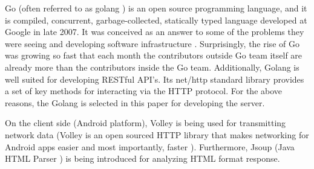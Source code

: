 Go (often referred to as golang \cite{google.golang.2016}) is an open source programming language, and it is compiled, concurrent, garbage-collected, statically typed language developed at Google in late 2007. It was conceived as an answer to some of the problems they were seeing and developing software infrastructure \cite{google.talk-golang.2012}. Surprisingly, the rise of Go was growing so fast that each month the contributors outside Go team itself are already more than the contributors inside the Go team. Additionally, Golang is well suited for developing RESTful API’s. Its net/http standard library provides a set of key methods for interacting via the HTTP protocol. For the above reasons, the Golang is selected in this paper for developing the server. 

On the client side (Android platform), Volley is being used for transmitting network data (Volley is an open sourced HTTP library that makes networking for Android apps easier and most importantly, faster \cite{google.volley.2016}). Furthermore, Jsoup (Java HTML Parser \cite{joup.2016}) is being introduced for analyzing HTML format response.

